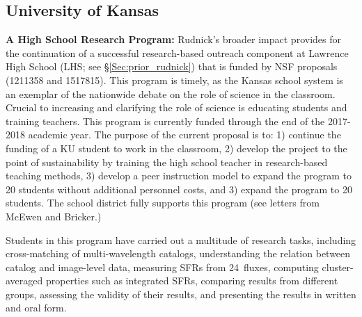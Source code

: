 \documentclass[11pt, preprint]{aastex}
\begin{document}
{\subsection{University of Kansas}
\label{BI}
\noindent \textbf{A High School Research Program:} Rudnick's broader
impact provides for the continuation of a successful research-based
outreach component at Lawrence High School (LHS; see
\S\ref{Sec:prior_rudnick}) that is funded by NSF proposals (1211358 and 1517815). This program is timely, as the Kansas
school system is an exemplar of the nationwide debate on the role of
science in the classroom. Crucial to increasing and clarifying the
role of science is educating students and training teachers.
This program is currently funded through the end of the 2017-2018
academic year. The purpose of the current proposal is to: 1) continue
the funding of a KU student to work in the classroom, 2) develop the
project to the point of sustainability by training the high school
teacher in research-based teaching methods, 3) develop a peer
instruction model to expand the program to 20 students without
additional personnel costs, and 3) expand the program to 20
students. The school district fully supports this program (see letters
from McEwen and Bricker.)

Students in this program have carried out a multitude of research tasks, including cross-matching of multi-wavelength catalogs, understanding the relation between catalog and image-level data, measuring SFRs from 24\micron\ fluxes, computing cluster-averaged properties such as integrated SFRs, comparing results from different groups, assessing the validity of their results, and presenting the results in written and oral form.

}
\end{document}
